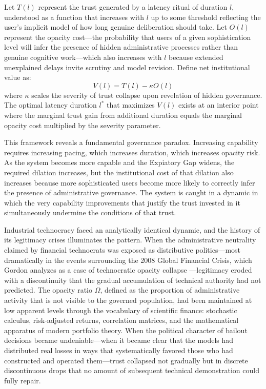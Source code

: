 \documentclass[12pt]{article}
\begin{document}
Let $T(l)$ represent the trust generated by a latency ritual of duration $l$, understood as a function that increases with $l$ up to some threshold reflecting the user's implicit model of how long genuine deliberation should take. Let $O(l)$ represent the opacity cost---the probability that users of a given sophistication level will infer the presence of hidden administrative processes rather than genuine cognitive work---which also increases with $l$ because extended unexplained delays invite scrutiny and model revision. Define net institutional value as:
\[
V(l) = T(l) - \kappa O(l)
\]
where $\kappa$ scales the severity of trust collapse upon revelation of hidden governance. The optimal latency duration $l^*$ that maximizes $V(l)$ exists at an interior point where the marginal trust gain from additional duration equals the marginal opacity cost multiplied by the severity parameter.

This framework reveals a fundamental governance paradox. Increasing capability requires increasing pacing, which increases duration, which increases opacity risk. As the system becomes more capable and the Expiatory Gap widens, the required dilation increases, but the institutional cost of that dilation also increases because more sophisticated users become more likely to correctly infer the presence of administrative governance. The system is caught in a dynamic in which the very capability improvements that justify the trust invested in it simultaneously undermine the conditions of that trust.

Industrial technocracy faced an analytically identical dynamic, and the history of its legitimacy crises illuminates the pattern. When the administrative neutrality claimed by financial technocrats was exposed as distributive politics---most dramatically in the events surrounding the 2008 Global Financial Crisis, which Gordon analyzes as a case of technocratic opacity collapse \citep{GordonManyWorlds2023}---legitimacy eroded with a discontinuity that the gradual accumulation of technical authority had not predicted. The opacity ratio $\Omega$, defined as the proportion of administrative activity that is not visible to the governed population, had been maintained at low apparent levels through the vocabulary of scientific finance: stochastic calculus, risk-adjusted returns, correlation matrices, and the mathematical apparatus of modern portfolio theory. When the political character of bailout decisions became undeniable---when it became clear that the models had distributed real losses in ways that systematically favored those who had constructed and operated them---trust collapsed not gradually but in discrete discontinuous drops that no amount of subsequent technical demonstration could fully repair.
\end{document}
